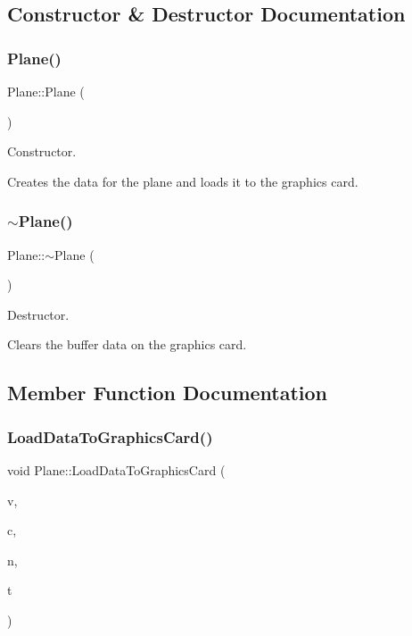 \subsection{Constructor \& Destructor Documentation}
\mbox{\label{class_plane_acac0d9c003e0ab10d07b146c3566a0c7}} 
\subsubsection{\texorpdfstring{Plane()}{Plane()}}
{\footnotesize\ttfamily Plane\+::\+Plane (\begin{DoxyParamCaption}{ }\end{DoxyParamCaption})}



Constructor. 

Creates the data for the plane and loads it to the graphics card. \mbox{\label{class_plane_a69abd86051c880dcb44b249ad10c4436}} 
\subsubsection{\texorpdfstring{$\sim$\+Plane()}{~Plane()}}
{\footnotesize\ttfamily Plane\+::$\sim$\+Plane (\begin{DoxyParamCaption}{ }\end{DoxyParamCaption})}



Destructor. 

Clears the buffer data on the graphics card. 

\subsection{Member Function Documentation}
\mbox{\label{class_plane_a2a1cfed2e4f521aaa66082c8d9dc7ad4}} 
\subsubsection{\texorpdfstring{Load\+Data\+To\+Graphics\+Card()}{LoadDataToGraphicsCard()}}
{\footnotesize\ttfamily void Plane\+::\+Load\+Data\+To\+Graphics\+Card (\begin{DoxyParamCaption}\item[{G\+Lint}]{v,  }\item[{G\+Lint}]{c,  }\item[{G\+Lint}]{n,  }\item[{G\+Lint}]{t }\end{DoxyParamCaption})}



